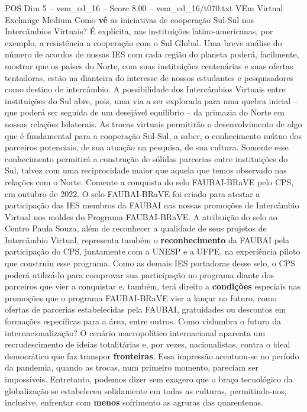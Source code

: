 \begin{textsample}{POS Dim 5 – vem\_ed\_16 – Score 8.00 – vem\_ed\_16/t070.txt}  \label{ex:f5_pos_057}
VEm Virtual Exchange Medium Como \textbf{vê} as iniciativas de cooperação Sul-Sul nos Intercâmbios Virtuais?
É explícita, nas instituições latino-americanas, por exemplo, a resistência a cooperação com o Sul Global.
Uma breve análise do número de acordos de nossas IES com cada região do planeta poderá, facilmente, mostrar que os países do Norte, com suas instituições centenárias e suas ofertas tentadoras, estão na dianteira do interesse de nossos estudantes e pesquisadores como destino de intercâmbio.
A possibilidade dos Intercâmbios Virtuais entre instituições do Sul abre, pois, uma via a ser explorada para uma quebra inicial – que poderá ser seguida de um desejável equilíbrio – da primazia do Norte em nossas relações bilaterais.
As trocas virtuais permitirão o desenvolvimento de algo que é fundamental para a cooperação Sul-Sul, a saber, o conhecimento mútuo dos parceiros potenciais, de sua atuação na pesquisa, de sua cultura.
Somente esse conhecimento permitirá a construção de sólidas parcerias entre instituições do Sul, talvez com uma reciprocidade maior que aquela que temos observado nas relações com o Norte.
Comente a conquista do selo FAUBAI-BRaVE pelo CPS, em outubro de 2022.
O selo FAUBAI-BRaVE foi criado para atestar a participação das IES membros da FAUBAI nas nossas promoções de Intercâmbio Virtual nos moldes do Programa FAUBAI-BRaVE.
A atribuição do selo ao Centro Paula Souza, além de reconhecer a qualidade de seus projetos de Intercâmbio Virtual, representa também o \textbf{reconhecimento} da FAUBAI pela participação do CPS, juntamente com a UNESP e a UFPE, na experiência piloto que construiu esse programa.
Como as demais IES portadoras desse selo, o CPS poderá utilizá-lo para comprovar sua participação no programa diante dos parceiros que vier a conquistar e, também, terá direito a \textbf{condições} especiais nas promoções que o programa FAUBAI-BRaVE vier a lançar no futuro, como ofertas de parcerias estabelecidas pela FAUBAI, gratuidades ou descontos em formações específicas para a área, entre outros.
Como vislumbra o futuro da internacionalização?
O cenário macropolítico internacional aparenta um recrudescimento de ideias totalitárias e, por vezes, nacionalistas, contra o ideal democrático que faz transpor \textbf{fronteiras}.
Essa impressão acentuou-se no período da pandemia, quando as trocas, num primeiro momento, pareciam ser impossíveis.
Entretanto, podemos dizer sem exagero que o braço tecnológico da globalização se estabeleceu solidamente em todas as culturas, permitindo-nos, inclusive, enfrentar com \textbf{menos} sofrimento as agruras das quarentenas.

\end{textsample}
